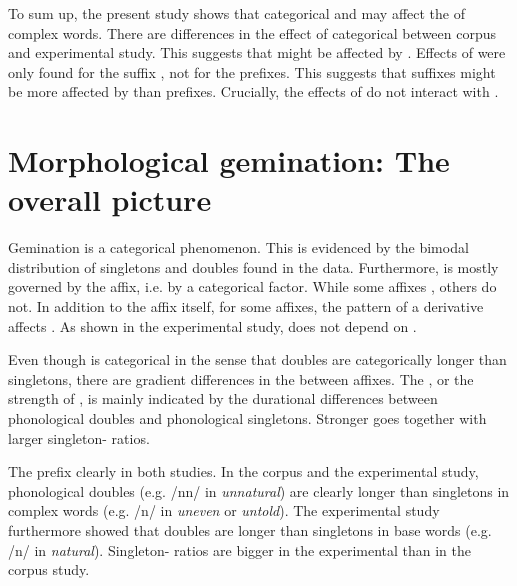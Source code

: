 To sum up, the present study shows that categorical  and  may affect the  of complex words.
 There are differences in the effect of categorical  between corpus and experimental study. This suggests
that  might be affected by . 
Effects of  were only found for the suffix , not for the prefixes. This suggests that suffixes might be more affected by  than prefixes.
 Crucially, the effects of  do not interact with . 




\section{Morphological gemination: The overall picture}

Gemination is a categorical phenomenon. This is evidenced by the bimodal distribution of singletons and doubles found in the data. Furthermore,  is mostly governed by the affix, i.e. by a categorical factor. While some affixes , others do not. In addition to the affix itself, for some affixes, the  pattern of a derivative affects . 
As shown in the experimental study,  does not depend on .

Even though  is categorical in the sense that doubles are categorically longer than singletons, there are gradient differences in the  between affixes. The , or the strength of , is mainly indicated by the durational differences between phonological doubles and phonological singletons. Stronger  goes together with larger singleton- ratios. 


The prefix  clearly  in both studies. In the corpus and the experimental study, phonological doubles (e.g. /nn/ in \textit{unnatural}) are clearly longer than singletons in complex words (e.g. /n/ in \textit{uneven} or \textit{untold}). The experimental study furthermore showed that doubles are longer than singletons in base words  (e.g. /n/ in \textit{natural}). Singleton- ratios are bigger in the experimental than in the corpus study.


